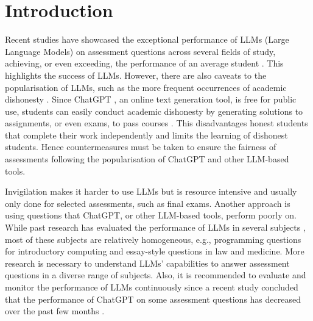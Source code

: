 \documentclass[sigconf,review]{acmart}
\begin{document}

\maketitle

\section{Introduction}
Recent studies have showcased the exceptional performance of LLMs (Large Language Models) on assessment questions across several fields of study, achieving, or even exceeding, the performance of an average student \cite{testcodex, testcopilot, testgpt, testcs2, testhigher, testbar, testmed}. This highlights the success of LLMs. However, there are also caveats to the popularisation of LLMs, such as the more frequent occurrences of academic dishonesty \cite{acadint}. Since ChatGPT \cite{chatgpt}, an online text generation tool, is free for public use, students can easily conduct academic dishonesty by generating solutions to assignments, or even exams, to pass courses \cite{gptacadint}. This disadvantages honest students that complete their work independently and limits the learning of dishonest students. Hence countermeasures must be taken to ensure the fairness of assessments following the popularisation of ChatGPT and other LLM-based tools.

Invigilation makes it harder to use LLMs but is resource intensive and usually only done for selected assessments, such as final exams.
Another approach is using questions that ChatGPT, or other LLM-based tools, perform poorly on. While past research has evaluated the performance of LLMs in several subjects \cite{testcodex, testcopilot, testgpt, testcs2, testhigher, testbar, testmed}, most of these subjects are relatively homogeneous, e.g., programming questions for introductory computing and essay-style questions in law and medicine. More research is necessary to understand LLMs' capabilities to answer assessment questions in a diverse range of subjects. Also, it is recommended to evaluate and monitor the performance of LLMs continuously since a recent study  concluded that the performance of ChatGPT on some assessment questions has decreased over the past few months \cite{gptworse}.
\end{document}

